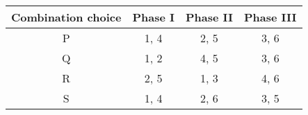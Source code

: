 \begin{tabular}[12pt]{ |c| c| c| c|}
    \hline
    \textbf{Combination choice} & \textbf{Phase I} & \textbf{Phase II} & \textbf{Phase III} \\ 
    \hline
    P & 1, 4 & 2, 5 & 3, 6 \\
    \hline 
    Q & 1, 2 & 4, 5 & 3, 6 \\
    \hline
    R & 2, 5 & 1, 3 & 4, 6 \\
    \hline
    S & 1, 4 & 2, 6 & 3, 5 \\
    \hline
    \end{tabular}
